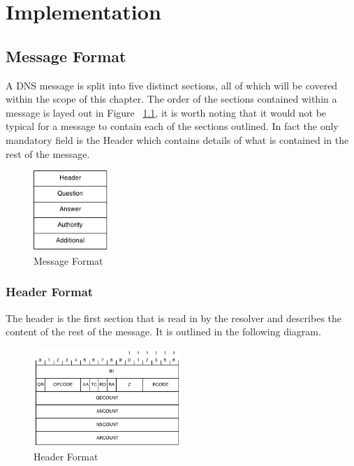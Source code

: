 \documentclass{l3proj}
\begin{document}
\chapter{Implementation}
\label{impl}

\section{Message Format}
\label{messageformat}

A DNS message is split into five distinct sections, all of which will be covered within the scope of this chapter. The order of the sections contained within a message is layed out in Figure ~\ref{fig:message_format}, it is worth noting that it would not be typical for a message to contain each of the sections outlined. In fact the only mandatory field is the Header which contains details of what is contained in the rest of the message.

\begin{figure}[h]
    \centering
    \includegraphics[width=0.25\textwidth]{images/message_format.png}
    \caption{Message Format}
    \label{fig:message_format}
\end{figure}



\subsection{Header Format}
\label{sec:header_format}

The header is the first section that is read in by the resolver and describes the content of the rest of the message. It is outlined in the following diagram.

\begin{figure}[h]
    \centering
    \includegraphics[width=0.5\textwidth]{images/header_format.png}
    \caption{Header Format}
    \label{fig:header_format}
\end{figure}
\end{document}
